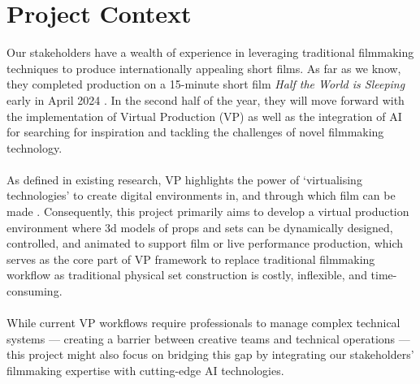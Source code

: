 \documentclass[12pt,a4paper]{report}
\begin{document}
\section{Project Context}
Our stakeholders have a wealth of experience in leveraging traditional filmmaking techniques to produce internationally appealing short films. As far as we know, they completed production
on a 15-minute short film \textit{Half the World is Sleeping} early in April 2024 \cite{half_the_world_is_sleeping}. In the second half of the year, they will move forward with the implementation of Virtual Production (VP) as well as the integration of AI for searching for inspiration and tackling the challenges of novel filmmaking technology.
\\\\
As defined in existing research, VP highlights the power of `virtualising technologies' to create digital environments in, and through which film can be made \cite{willment_swords_2023_vp}. Consequently, this project primarily aims to develop a virtual production environment where 3d models of props and sets can be dynamically designed, controlled, and animated to support film or live performance production, which serves as the core part of VP framework to replace traditional filmmaking workflow as traditional physical set construction is costly, inflexible, and time-consuming. 
\\\\
While current VP workflows require professionals to manage complex technical systems — creating a barrier between creative teams and technical operations — this project might also focus on bridging this gap by integrating our stakeholders' filmmaking expertise with cutting-edge AI technologies.
\end{document}
